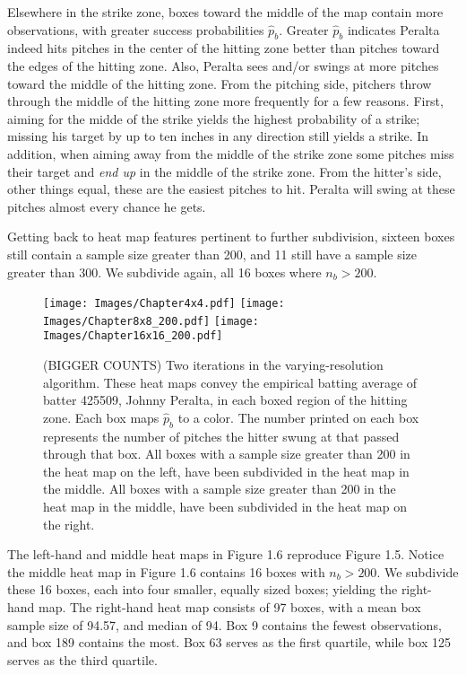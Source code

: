 Elsewhere in the strike zone, boxes toward the middle of the map contain more observations, with greater success probabilities $\hat{p}_{b}$. Greater $\hat{p}_{b}$ indicates Peralta indeed hits pitches in the center of the hitting zone better than pitches toward the edges of the hitting zone. Also, Peralta sees and/or swings at more pitches toward the middle of the hitting zone. From the pitching side, pitchers throw through the middle of the hitting zone more frequently for a few reasons. First, aiming for the midde of the strike yields the highest probability of a strike; missing his target by up to ten inches in any direction still yields a strike. In addition, when aiming away from the middle of the strike zone some pitches miss their target and {\it end up} in the middle of the strike zone. From the hitter's side, other things equal, these are the easiest pitches to hit. Peralta will swing at these pitches almost every chance he gets.

Getting back to heat map features pertinent to further subdivision, sixteen boxes still contain a sample size greater than 200, and 11 still have a sample size greater than 300. We subdivide again, all 16 boxes where $n_{b} > 200$.
        \begin{figure}[H]
      	\centering
      	\texttt{[image: Images/Chapter4x4.pdf]}
      	\texttt{[image: Images/Chapter8x8\_200.pdf]} 
      	\texttt{[image: Images/Chapter16x16\_200.pdf]} 
      	\caption{(BIGGER COUNTS) Two iterations in the varying-resolution algorithm. These heat maps convey the empirical batting average of batter 425509, Johnny Peralta, in each boxed region of the hitting zone. Each box maps $\hat{p}_{b}$ to a color. The number printed on each box represents the number of pitches the hitter swung at that passed through that box. All boxes with a sample size greater than 200 in the heat map on the left, have been subdivided in the heat map in the middle. All boxes with a sample size greater than 200 in the heat map in the middle, have been subdivided in the heat map on the right.}
      	\end{figure}
The left-hand and middle heat maps in Figure 1.6 reproduce Figure 1.5. Notice the middle heat map in Figure 1.6 contains 16 boxes with $n_{b} > 200$. We subdivide these 16 boxes, each into four smaller, equally sized boxes; yielding the right-hand map. The right-hand heat map consists of 97 boxes, with a mean box sample size of 94.57, and median of 94. Box 9 contains the fewest observations, and box 189 contains the most. Box 63 serves as the first quartile, while box 125 serves as the third quartile. 

